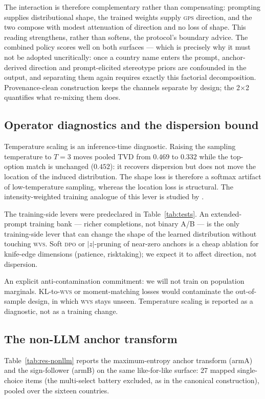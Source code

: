 \documentclass[10pt,letterpaper]{article}
\newcommand{\WVS}{\textsc{wvs}}
\newcommand{\GPS}{\textsc{gps}}
\newcommand{\DPO}{\textsc{dpo}}
\begin{document}
The interaction is therefore complementary rather than compensating: prompting supplies distributional shape, the trained weights supply \GPS{} direction, and the two compose with modest attenuation of direction and no loss of shape. This reading strengthens, rather than softens, the protocol's boundary advice. The combined policy scores well on both surfaces --- which is precisely why it must not be adopted uncritically: once a country name enters the prompt, anchor-derived direction and prompt-elicited stereotype priors are confounded in the output, and separating them again requires exactly this factorial decomposition. Provenance-clean construction keeps the channels separate by design; the 2$\times$2 quantifies what re-mixing them does.

\subsection{Operator diagnostics and the dispersion bound}
Temperature scaling is an inference-time diagnostic. Raising the sampling temperature to $T=3$ moves pooled TVD from $0.469$ to $0.332$ while the top-option match is unchanged ($0.452$): it recovers dispersion but does not move the location of the induced distribution. The shape loss is therefore a softmax artifact of low-temperature sampling, whereas the location loss is structural. The intensity-weighted training analogue of this lever is studied by \cite{sharifnassab2024}.

The training-side levers were predeclared in Table~\ref{tab:tests}. An extended-prompt training bank --- richer completions, not binary A/B --- is the only training-side lever that can change the shape of the learned distribution without touching \WVS{}. Soft \DPO{} or $|z|$-pruning of near-zero anchors is a cheap ablation for knife-edge dimensions (patience, risktaking); we expect it to affect direction, not dispersion.

An explicit anti-contamination commitment: we will not train on population marginals. KL-to-\WVS{} or moment-matching losses would contaminate the out-of-sample design, in which \WVS{} stays unseen. Temperature scaling is reported as a diagnostic, not as a training change.

\subsection{The non-LLM anchor transform}
Table~\ref{tab:res-nonllm} reports the maximum-entropy anchor transform (armA) and the sign-follower (armB) on the same like-for-like surface: 27 mapped single-choice items (the multi-select battery excluded, as in the canonical construction), pooled over the sixteen countries.
\end{document}
